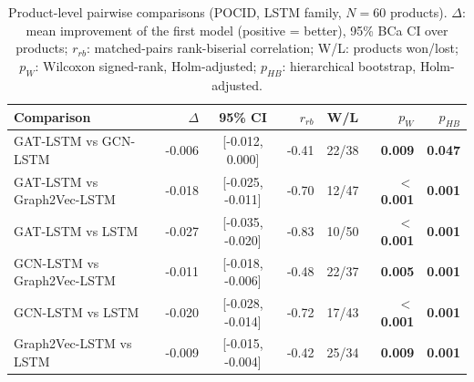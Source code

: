 \begin{table}[ht]
\centering\small
\caption{Product-level pairwise comparisons (POCID, LSTM family, $N=60$ products). $\Delta$: mean improvement of the first model (positive = better), 95\% BCa CI over products; $r_{rb}$: matched-pairs rank-biserial correlation; W/L: products won/lost; $p_{W}$: Wilcoxon signed-rank, Holm-adjusted; $p_{HB}$: hierarchical bootstrap, Holm-adjusted.}
\label{tab:pairwise_pocid_lstm}
\begin{tabular}{lrcrcrr}
\toprule
Comparison & $\Delta$ & 95\% CI & $r_{rb}$ & W/L & $p_{W}$ & $p_{HB}$ \\
\midrule
GAT-LSTM vs GCN-LSTM & -0.006 & [-0.012, 0.000] & -0.41 & 22/38 & \textbf{0.009} & \textbf{0.047} \\
GAT-LSTM vs Graph2Vec-LSTM & -0.018 & [-0.025, -0.011] & -0.70 & 12/47 & \textbf{$<$0.001} & \textbf{0.001} \\
GAT-LSTM vs LSTM & -0.027 & [-0.035, -0.020] & -0.83 & 10/50 & \textbf{$<$0.001} & \textbf{0.001} \\
GCN-LSTM vs Graph2Vec-LSTM & -0.011 & [-0.018, -0.006] & -0.48 & 22/37 & \textbf{0.005} & \textbf{0.001} \\
GCN-LSTM vs LSTM & -0.020 & [-0.028, -0.014] & -0.72 & 17/43 & \textbf{$<$0.001} & \textbf{0.001} \\
Graph2Vec-LSTM vs LSTM & -0.009 & [-0.015, -0.004] & -0.42 & 25/34 & \textbf{0.009} & \textbf{0.001} \\
\bottomrule
\end{tabular}
\end{table}
